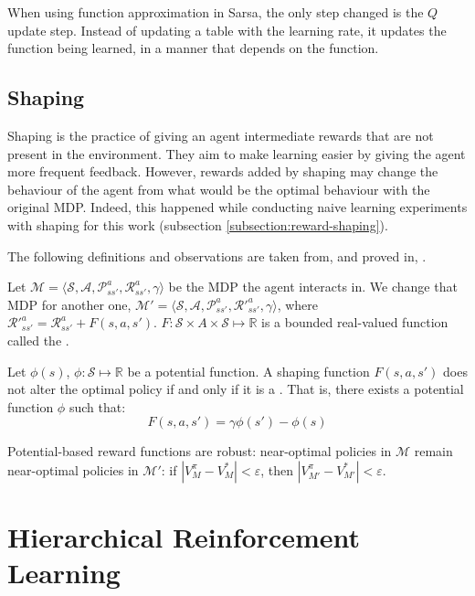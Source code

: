 When using function approximation in Sarsa, the only step changed is the $Q$
update step. Instead of updating a table with the learning rate, it updates the
function being learned, in a manner that depends on the function.

\subsection{Shaping}
Shaping is the practice of giving an agent intermediate rewards that are not
present in the environment. They aim to make learning easier by giving the agent
more frequent feedback. However, rewards added by shaping may change the
behaviour of the agent from what would be the optimal behaviour with the original
\ac{MDP}. Indeed, this happened while
conducting naive learning experiments with shaping for this work (subsection
\ref{subsection:reward-shaping}).

The following definitions and observations are taken from, and proved in,
\cite{ng1999policy}.

Let $\mathcal{M} = \langle \mathcal{S}, \mathcal{A},
\mathcal{P}^a_{ss'}, \mathcal{R}^a_{ss'}, \gamma \rangle$ be the \ac{MDP} the
agent interacts in. We change that \ac{MDP} for another one, $\mathcal{M}' = \langle
\mathcal{S}, \mathcal{A}, \mathcal{P}^a_{ss'}, \mathcal{R}'^a_{ss'}, \gamma
\rangle$, where $\mathcal{R}'^a_{ss'} = \mathcal{R}^a_{ss'} + F(s, a, s')$.
$F : \mathcal{S} \times A \times \mathcal{S} \mapsto \mathbb{R}$ is a bounded
real-valued function called the .

Let $\phi(s)$, $\phi : \mathcal{S} \mapsto \mathbb{R}$ be a potential function.
A shaping function $F(s, a, s')$ does not alter the optimal policy if and only
if it is a . That is, there exists a
potential function $\phi$ such that:
\begin{equation}
  F(s, a, s') = \gamma \phi(s') - \phi(s)
\end{equation}

Potential-based reward functions are robust: near-optimal policies
in $\mathcal{M}$ remain near-optimal policies in $\mathcal{M'}$: if $\left|
V^\pi_M - V^*_M \right| < \varepsilon$, then $\left| V^\pi_{M'} - V^*_{M'}
\right| < \varepsilon$.

\section{Hierarchical Reinforcement Learning\label{section:hierarchical-rl}}

